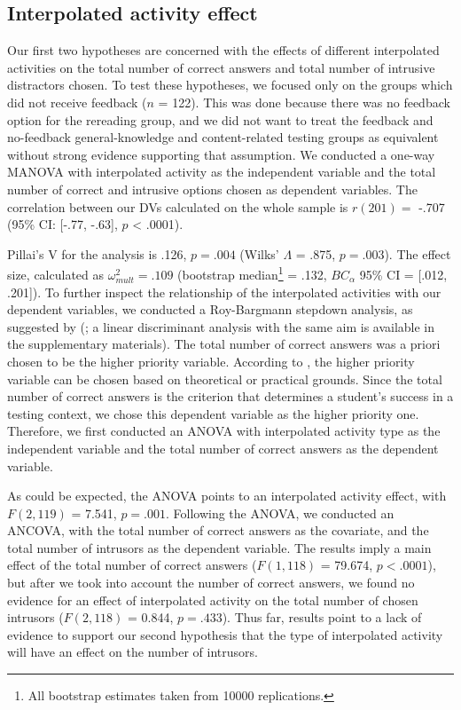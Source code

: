 \documentclass[../main.tex]{subfiles}
\begin{document}
\hypertarget{interpolated-activity-effect}{%
\subsection{Interpolated activity
effect}\label{interpolated-activity-effect}}

Our first two hypotheses are concerned with the effects of different
interpolated activities on the total number of correct answers and total
number of intrusive distractors chosen. To test these hypotheses, we
focused only on the groups which did not receive feedback (\(n\) = 122).
This was done because there was no feedback option for the rereading
group, and we did not want to treat the feedback and no-feedback
general-knowledge and content-related testing groups as equivalent
without strong evidence supporting that assumption. We conducted a
one-way MANOVA with interpolated activity as the independent variable
and the total number of correct and intrusive options chosen as
dependent variables. The correlation between our DVs calculated on the
whole sample is \(r(201) =\) -.707 (95\% CI: {[}-.77, -.63{]}, \(p\)
\textless{} .0001).

Pillai's V for the analysis is .126, \(p = .004\) (Wilks' \(\Lambda\) =
.875, \(p = .003\)). The effect size, calculated as
\(\omega^2_{mult} = .109\) (bootstrap
median\footnote{All bootstrap estimates taken from 10000 replications.}
= .132, \(BC_\alpha\) 95\% CI = {[}.012, .201{]}). To further inspect
the relationship of the interpolated activities with our dependent
variables, we conducted a Roy-Bargmann stepdown analysis, as suggested
by \citeauthor{tabachnickUsingMultivariateStatistics2012}
(\citeyear{tabachnickUsingMultivariateStatistics2012}; a linear
discriminant analysis with the same aim is available in the
supplementary materials). The total number of correct answers was a
priori chosen to be the higher priority variable. According to
\citet{tabachnickUsingMultivariateStatistics2012}, the higher priority
variable can be chosen based on theoretical or practical grounds. Since
the total number of correct answers is the criterion that determines a
student's success in a testing context, we chose this dependent variable
as the higher priority one. Therefore, we first conducted an ANOVA with
interpolated activity type as the independent variable and the total
number of correct answers as the dependent variable.

As could be expected, the ANOVA points to an interpolated activity
effect, with \(F(2, 119)\) = 7.541, \(p = .001\). Following the ANOVA,
we conducted an ANCOVA, with the total number of correct answers as the
covariate, and the total number of intrusors as the dependent variable.
The results imply a main effect of the total number of correct answers
(\(F(1, 118)\) = 79.674, \(p < .0001\)), but after we took into account
the number of correct answers, we found no evidence for an effect of
interpolated activity on the total number of chosen intrusors
(\(F (2, 118)\) = 0.844, \(p = .433\)). Thus far, results point to a
lack of evidence to support our second hypothesis that the type of
interpolated activity will have an effect on the number of intrusors.
\end{document}
